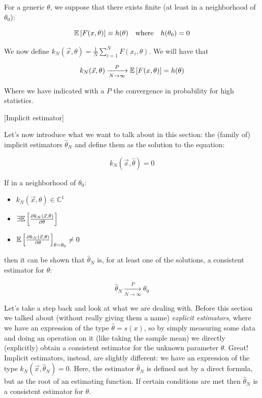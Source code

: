 For a generic $\theta$, we suppose that there exists finite (at least in a neighborhood of $\theta_0$):

	\[
	\mathbb{E}\left[F(x,\theta)\right]\equiv h(\theta)\quad \text{where}\quad h(\theta_0)=0
	\]

We now define $k_N(\vec{x},\theta) = \frac{1}{N}\sum_{i=1}^N F(x_i,\theta)$. We will have that

	\[
	k_N(\vec{x},\theta) \xrightarrow[N \to \infty]{P} \mathbb{E}\left[F(x,\theta)\right] = h(\theta)
	\]

Where we have indicated with a $P$ the convergence in probability for high statistics. 


\begin{definition}\label{def:implicit_estimator}[Implicit estimator]
	
	Let's now introduce what we want to talk about in this section: the (family of) implicit estimators $\hat\theta_N$ and define them as the solution to the equation: 
	
	\[
	k_N(\vec{x}, \hat\theta) = 0
	\]
	
 	If in a neighborhood of $\theta_0$:
 	
 	\begin{itemize}
 		\item $k_N(\vec{x},\theta)\in\mathbb{C}^1$
 		\item $\exists\mathbb{E}\left[\frac{\partial k_N(\vec{x},\theta)}{\partial \theta}\right]$
 		\item $\mathbb{E}\left[\frac{\partial k_N(\vec{x},\theta)}{\partial\theta}\right]_{\theta=\theta_0}\neq 0$
 	\end{itemize}
 	
 	then it can be shown that $\hat\theta_N$ is, for at least one of the solutions, a consistent estimator for $\theta$:
 	
	 	\[
	 	\hat\theta_N \xrightarrow[N \to \infty]{P} \theta_0
	 	\]
	 	
\end{definition}

Let's take a step back and look at what we are dealing with. Before this section we talked about (without really giving them a name) \emph{explicit estimators}, where we have an expression of the type $\hat\theta = s(x)$, so by simply measuring some data and doing an operation on it (like taking the sample mean) we directly (explicitly) obtain a consistent estimator for the unknown parameter $\theta$. Great! Implicit estimators, instead, are slightly different: we have an expression of the type $k_N(\vec{x}, \hat\theta_N) = 0$. Here, the estimator $\hat\theta_N$ is defined not by a direct formula, but as the root of an estimating function. If certain conditions are met then $\hat\theta_N$ is a consistent estimator for $\theta$.

